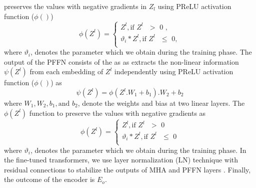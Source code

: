\documentclass[preprint,review,12pt]{elsarticle}
\begin{document}
 preserves the values with negative gradients in $Z_l$ using  PReLU activation function ($\phi()$) 
\begin{equation}  \label{eq7}
	\phi(Z^l) = 
	\begin{cases}
		Z^l, \text {if $Z^l$ $>$ 0 }, \\
		\vartheta _{i} * Z^l, \text {if $Z^l$ $\leq$ 0}, \\
	\end{cases}
\end{equation}
where $\vartheta_{i}$, denotes the parameter which we obtain during the training phase. The output of the PFFN consists of the 
as \cite{prelu} as extracts the non-linear information  $\psi(Z^l)$ from each embedding of $Z^l$ independently using  PReLU activation function ($\phi()$) as 
\begin{equation}  \label{eq2}
	\psi(Z^l) = \phi(Z^l.W_1 + b_1).W_2 + b_2
\end{equation}
where $W_1, W_2, b_1, \text{and } b_2$, denote the weights and bias at two linear layers. The $\phi(Z^l)$ function to preserve the values with negative gradients \cite{prelu} as
\begin{equation}  \label{eq7}
	\phi(Z^l) = 
	\begin{cases}
		Z^l, \text {if $Z^l$ $>$ 0 } \\
		\vartheta _{i} * Z^l, \text {if $Z^l$ $\leq$ 0} \\
	\end{cases}
\end{equation}
where $\vartheta_{i}$, denotes the parameter which we obtain during the training phase. In the fine-tuned transformers, we use layer normalization (LN) technique with residual connections to stabilize the outputs of MHA and PFFN layers \cite{LN, arxiv.org/pdf/2002.04745.pdf} \cite{LN}. Finally, the outcome of the encoder is $E_o$. 
\end{document}
